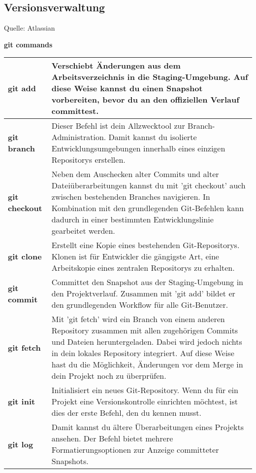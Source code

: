 \clearpage

\subsection{Versionsverwaltung}
\label{sec:Versionsverwaltung} 

Quelle: Atlassian \cite{gitCommands}

\textbf{git commands}

\begin{center}
	\setlength\arrayrulewidth{1pt}
	\begin{tabular}{|p{} | p{}|}
		\hline
		\textbf{git add} & Verschiebt Änderungen aus dem Arbeitsverzeichnis in die Staging-Umgebung. Auf diese Weise kannst du einen Snapshot vorbereiten, bevor du an den offiziellen Verlauf committest.\\
		\hline
		\textbf{git branch} & Dieser Befehl ist dein Allzwecktool zur Branch-Administration. Damit kannst du isolierte Entwicklungsumgebungen innerhalb eines einzigen Repositorys erstellen.\\
		\hline
		\textbf{git checkout} & Neben dem Auschecken alter Commits und alter Dateiüberarbeitungen kannst du mit 'git checkout' auch zwischen bestehenden Branches navigieren. In Kombination mit den grundlegenden Git-Befehlen kann dadurch in einer bestimmten Entwicklungslinie gearbeitet werden.\\
		\hline
		\textbf{git clone} & Erstellt eine Kopie eines bestehenden Git-Repositorys. Klonen ist für Entwickler die gängigste Art, eine Arbeitskopie eines zentralen Repositorys zu erhalten.\\
		\hline
		\textbf{git commit} & Committet den Snapshot aus der Staging-Umgebung in den Projektverlauf. Zusammen mit 'git add' bildet er den grundlegenden Workflow für alle Git-Benutzer.\\
		\hline
		\textbf{git fetch} & Mit 'git fetch' wird ein Branch von einem anderen Repository zusammen mit allen zugehörigen Commits und Dateien heruntergeladen. Dabei wird jedoch nichts in dein lokales Repository integriert. Auf diese Weise hast du die Möglichkeit, Änderungen vor dem Merge in dein Projekt noch zu überprüfen.\\
		\hline
		\textbf{git init} & Initialisiert ein neues Git-Repository. Wenn du für ein Projekt eine Versionskontrolle einrichten möchtest, ist dies der erste Befehl, den du kennen musst.\\
		\hline
		\textbf{git log} & Damit kannst du ältere Überarbeitungen eines Projekts ansehen. Der Befehl bietet mehrere Formatierungsoptionen zur Anzeige committeter Snapshots.\\

\end{tabular}
\end{center}
